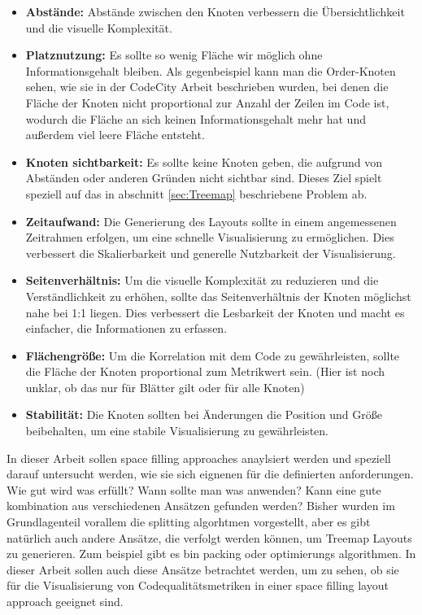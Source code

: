 \begin{itemize}
    \item \textbf{Abstände:} Abstände zwischen den Knoten verbessern die Übersichtlichkeit und die visuelle Komplexität.
    \item \textbf{Platznutzung:} Es sollte so wenig Fläche wir möglich ohne Informationsgehalt bleiben. Als gegenbeispiel kann man die Order-Knoten sehen, wie sie in der CodeCity Arbeit beschrieben wurden, bei denen die Fläche der Knoten nicht proportional zur Anzahl der Zeilen im Code ist, wodurch die Fläche an sich keinen Informationsgehalt mehr hat und außerdem viel leere Fläche entsteht.
    \item \textbf{Knoten sichtbarkeit:} Es sollte keine Knoten geben, die aufgrund von Abständen oder anderen Gründen nicht sichtbar sind. Dieses Ziel spielt speziell auf das in abschnitt \ref{sec:Treemap} beschriebene Problem ab.
    \item \textbf{Zeitaufwand:} Die Generierung des Layouts sollte in einem angemessenen Zeitrahmen erfolgen, um eine schnelle Visualisierung zu ermöglichen. Dies verbessert die Skalierbarkeit und generelle Nutzbarkeit der Visualisierung.
    \item \textbf{Seitenverhältnis:} Um die visuelle Komplexität zu reduzieren und die Verständlichkeit zu erhöhen, sollte das Seitenverhältnis der Knoten möglichst nahe bei 1:1 liegen. Dies verbessert die Lesbarkeit der Knoten und macht es einfacher, die Informationen zu erfassen.
    \item \textbf{Flächengröße:} Um die Korrelation mit dem Code zu gewährleisten, sollte die Fläche der Knoten proportional zum Metrikwert sein. (Hier ist noch unklar, ob das nur für Blätter gilt oder für alle Knoten)
    \item \textbf{Stabilität:} Die Knoten sollten bei Änderungen die Position und Größe beibehalten, um eine stabile Visualisierung zu gewährleisten. 
\end{itemize}

In dieser Arbeit sollen space filling approaches anaylsiert werden und speziell darauf untersucht werden, wie sie sich eignenen für die definierten anforderungen. Wie gut wird was erfüllt? Wann sollte man was anwenden? Kann eine gute kombination aus verschiedenen Ansätzen gefunden werden?
Bisher wurden im Grundlagenteil vorallem die splitting algorhtmen vorgestellt, aber es gibt natürlich auch andere Ansätze, die verfolgt werden können, um Treemap Layouts zu generieren. Zum beispiel gibt es bin packing oder optimierungs algorithmen. In dieser Arbeit sollen auch diese Ansätze betrachtet werden, um zu sehen, ob sie für die Visualisierung von Codequalitätsmetriken in einer space filling layout approach geeignet sind.

